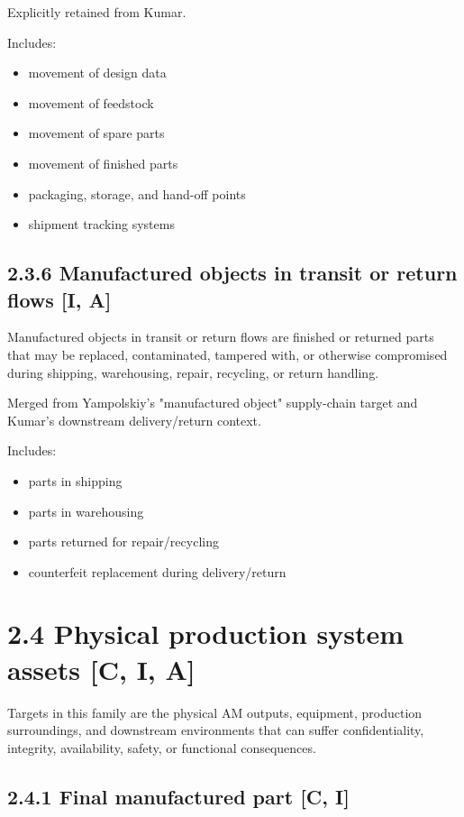 \documentclass[10pt,a4paper,oneside]{report}
\begin{document}
Explicitly retained from Kumar.

Includes:

\begin{itemize}
\item movement of design data
\item movement of feedstock
\item movement of spare parts
\item movement of finished parts
\item packaging, storage, and hand-off points
\item shipment tracking systems
\end{itemize}


\subsection{2.3.6 Manufactured objects in transit or return flows [I, A]}


Manufactured objects in transit or return flows are finished or returned parts that may be replaced, contaminated, tampered with, or otherwise compromised during shipping, warehousing, repair, recycling, or return handling.

Merged from Yampolskiy's "manufactured object" supply-chain target and Kumar's downstream delivery/return context.

Includes:

\begin{itemize}
\item parts in shipping
\item parts in warehousing
\item parts returned for repair/recycling
\item counterfeit replacement during delivery/return
\end{itemize}


\section{2.4 Physical production system assets [C, I, A]}


Targets in this family are the physical AM outputs, equipment, production surroundings, and downstream environments that can suffer confidentiality, integrity, availability, safety, or functional consequences.


\subsection{2.4.1 Final manufactured part [C, I]}
\end{document}
